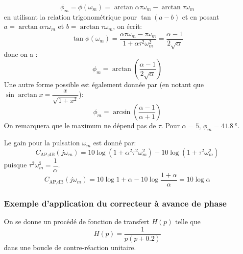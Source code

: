 \[
    \phi_m=\phi(\omega_m)=\arctan{\alpha\tau\omega_m}-\arctan{\tau\omega_m}
\]
en utilisant la relation trigonométrique pour $\tan{(a-b)}$ et en posant 
$a=\arctan{\alpha\tau\omega_m}$ et $b=\arctan{\tau\omega_m}$, on écrit:
\[
    \tan{\phi(\omega_m)}=\dfrac{\alpha\tau\omega_m-\tau\omega_m}
                               {1+\alpha\tau^2\omega_m^2}
                        =\dfrac{\alpha-1}{2\sqrt{\alpha}}
\]
donc on a :
\[
    \phi_m=\arctan{\left(\dfrac{\alpha-1}{2\sqrt{\alpha}}\right)}
\]
Une autre forme possible est également donnée par 
(en notant que $\sin\arctan{x}=\dfrac{x}{\sqrt{1+x^2}}$):
\[
    \phi_m=\arcsin{\left(\dfrac{\alpha-1}{\alpha+1}\right)}
\]
On remarquera que le maximum ne dépend pas de $\tau$.
Pour $\alpha=5$, $\phi_m=\SI{41.8}{\degree}$.

Le gain pour la pulsation $\omega_m$ est donné par:
\[
    C_{\text{AP},\si{\dB}}(j\omega_m)=10\log{(1+\alpha^2\tau^2\omega_m^2)}-
                               10\log{(1+\tau^2\omega_m^2)}
\]
puisque $\tau^2\omega_m^2=\dfrac{1}{\alpha}$.
\[
    C_{\text{AP},\si{\dB}}(j\omega_m)=
    10\log{1+\alpha}-10\log{\dfrac{1+\alpha}{\alpha}}=10\log{\alpha}
\]
\subsubsection*{Exemple d'application du correcteur à avance de phase}
On se donne un procédé de fonction de transfert $H(p)$ telle que
\[
    H(p)=\dfrac{1}{p(p+0.2)}
\]
dans une boucle de contre-réaction unitaire.

